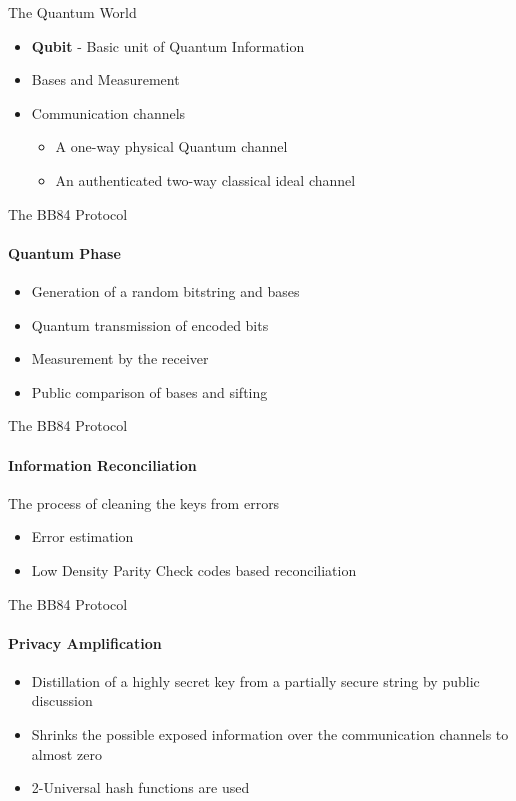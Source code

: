 \documentclass{beamer}
\begin{document}
\begin{frame}{The Quantum World}
    \begin{itemize}[<+->]
        \item \textbf{Qubit} - Basic unit of Quantum Information
        \item Bases and Measurement
        \item Communication channels
            \begin{itemize}
                \item A one-way physical Quantum channel
                \item An authenticated two-way classical ideal channel
              \end{itemize}
    \end{itemize}
\end{frame}


\begin{frame}{The BB84 Protocol}
	\framesubtitle{Quantum Phase}
    \begin{itemize}[<+->]
        \item Generation of a random bitstring and bases 
		\item Quantum transmission of encoded bits
		\item Measurement by the receiver
		\item Public comparison of bases and sifting
	\end{itemize}
\end{frame}


\begin{frame}{The BB84 Protocol}
	\framesubtitle{Information Reconciliation}
	The process of cleaning the keys from errors
	\begin{itemize}[<+->]
		\item Error estimation
		\item Low Density Parity Check codes based reconciliation
	\end{itemize}
\end{frame}


\begin{frame}{The BB84 Protocol}
	\framesubtitle{Privacy Amplification}
	\begin{itemize}[<+->]
	    \item Distillation of a highly secret key from a partially secure string by public discussion
		\item Shrinks the possible exposed information over the communication channels to almost zero
		\item 2-Universal hash functions are used
	\end{itemize}
\end{frame}
\end{document}

